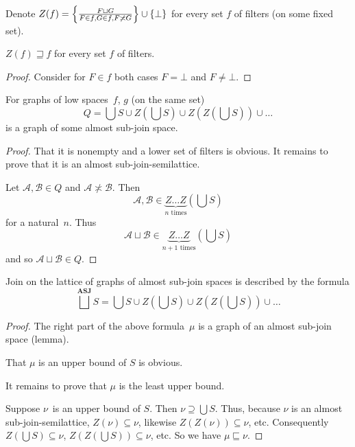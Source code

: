 Denote $Z(f)=\left\{ \frac{F\sqcup G}{F\in f,G\in f,F\not\asymp G}\right\}\cup\{\bot\}$ for every set $f$ of filters (on some fixed set).

\begin{prop}
$Z(f)\sqsupseteq f$ for every set $f$ of filters.
\end{prop}

\begin{proof}
Consider for $F\in f$ both cases $F=\bot$ and $F\ne\bot$.
\end{proof}

\begin{lem}
For graphs of low spaces~$f$, $g$ (on the same set)
\[
Q = \bigcup S\cup Z\left(\bigcup S\right)\cup Z\left(Z\left(\bigcup S\right)\right)\cup\dots
\]
is a graph of some almost sub-join space.
\end{lem}

\begin{proof}
That it is nonempty and a lower set of filters is obvious. It remains to prove that it is an almost sub-join-semilattice.

Let $\mathcal{A},\mathcal{B}\in Q$ and $\mathcal{A}\nasymp\mathcal{B}$.
Then
\[
\mathcal{A},\mathcal{B} \in \underbrace{Z\dots Z}_{n\text{ times}}\left(\bigcup S\right)
\]
for a natural~$n$. Thus
\[
\mathcal{A}\sqcup\mathcal{B} \in \underbrace{Z\dots Z}_{n+1\text{ times}}\left(\bigcup S\right)
\]
and so $\mathcal{A}\sqcup\mathcal{B}\in Q$.
\end{proof}

\begin{prop}
Join on the lattice of graphs of almost sub-join spaces is described by the formula
\[
\bigsqcup^{\mathbf{ASJ}}S = \bigcup S\cup Z\left(\bigcup S\right)\cup Z\left(Z\left(\bigcup S\right)\right)\cup\dots
\]
\end{prop}

\begin{proof}
The right part of the above formula~$\mu$ is a graph of an almost sub-join space (lemma).

That $\mu$ is an upper bound of $S$ is obvious.

It remains to prove that $\mu$ is the least upper bound.

Suppose $\nu$~is an upper bound of $S$. Then $\nu\supseteq\bigcup S$. Thus, because $\nu$ is an almost sub-join-semilattice,
$Z(\nu)\subseteq\nu$, likewise $Z(Z(\nu))\subseteq\nu$, etc. Consequently $Z(\bigcup S)\subseteq\nu$, $Z(Z(\bigcup S))\subseteq\nu$, etc.
So we have $\mu\sqsubseteq\nu$.
\end{proof}


